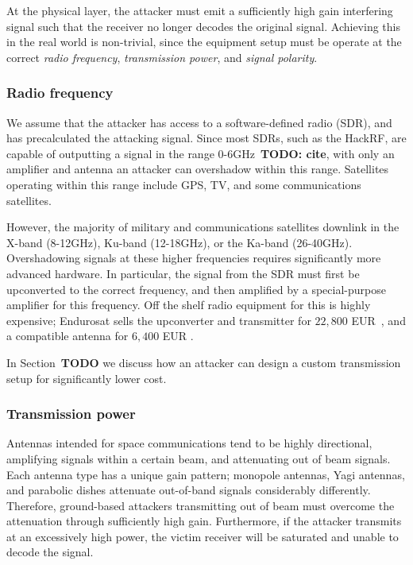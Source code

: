 At the physical layer, the attacker must emit a sufficiently high gain interfering signal such that the receiver no longer decodes the original signal.
Achieving this in the real world is non-trivial, since the equipment setup must be operate at the correct \textit{radio frequency}, \textit{transmission power}, and \textit{signal polarity}.

\subsubsection{Radio frequency}

We assume that the attacker has access to a software-defined radio (SDR), and has precalculated the attacking signal.
Since most SDRs, such as the HackRF, are capable of outputting a signal in the range 0-6GHz~\textbf{TODO: cite}, with only an amplifier and antenna an attacker can overshadow within this range.
Satellites operating within this range include GPS, TV, and some communications satellites.

However, the majority of military and communications satellites downlink in the X-band (8-12GHz), Ku-band (12-18GHz), or the Ka-band (26-40GHz).
Overshadowing signals at these higher frequencies requires significantly more advanced hardware.
In particular, the signal from the SDR must first be upconverted to the correct frequency, and then amplified by a special-purpose amplifier for this frequency.
Off the shelf radio equipment for this is highly expensive; Endurosat sells the upconverter and transmitter for $22,800$ EUR~\cite{endurosat:xbandtransmitter}, and a compatible antenna for $6,400$ EUR \cite{endurosat:xbandantenna}.

In Section~\textbf{TODO} we discuss how an attacker can design a custom transmission setup for significantly lower cost.

\subsubsection{Transmission power}

Antennas intended for space communications tend to be highly directional, amplifying signals within a certain beam, and attenuating out of beam signals.
Each antenna type has a unique gain pattern; monopole antennas, Yagi antennas, and parabolic dishes attenuate out-of-band signals considerably differently.
Therefore, ground-based attackers transmitting out of beam must overcome the attenuation through sufficiently high gain.
Furthermore, if the attacker transmits at an excessively high power, the victim receiver will be saturated and unable to decode the signal.

